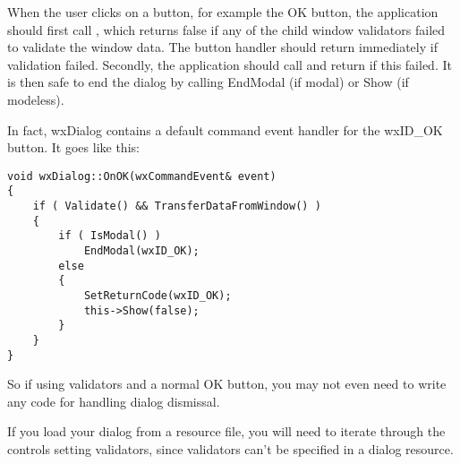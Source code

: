 
When the user clicks on a button, for example the OK button, the application should
first call , which returns false if
any of the child window validators failed to validate the window data. The button handler
should return immediately if validation failed. Secondly, the application should
call  and
return if this failed. It is then safe to end the dialog by calling EndModal (if modal)
or Show (if modeless).

In fact, wxDialog contains a default command event handler for the wxID\_OK button. It goes like
this:

\begin{verbatim}
void wxDialog::OnOK(wxCommandEvent& event)
{
    if ( Validate() && TransferDataFromWindow() )
    {
        if ( IsModal() )
            EndModal(wxID_OK);
        else
        {
            SetReturnCode(wxID_OK);
            this->Show(false);
        }
    }
}
\end{verbatim}

So if using validators and a normal OK button, you may not even need to write any
code for handling dialog dismissal.

If you load your dialog from a resource file, you will need to iterate through the controls
setting validators, since validators can't be specified in a dialog resource.

